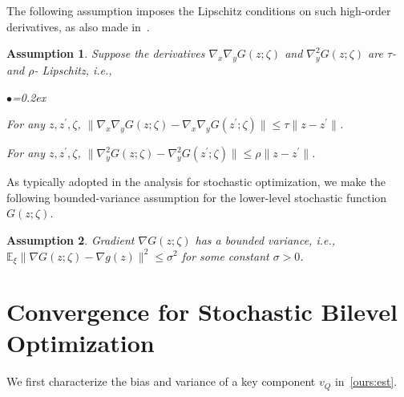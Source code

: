 \documentclass{osudissert96}
\newtheorem{assum}{Assumption}
\begin{document}
The following assumption imposes the Lipschitz conditions on such high-order derivatives, as also made in~\cite{ghadimi2018approximation}.
\begin{assum}\label{high_lip_stoc}
Suppose the derivatives $\nabla_x\nabla_y G(z;\zeta)$ and $\nabla_y^2 G(z;\zeta)$ are $\tau$- and $\rho$- Lipschitz, i.e.,
\begin{list}{$\bullet$}{\topsep=0.2ex \leftmargin=0.2in  \itemsep =0.02in}
\item For any $z,z^\prime,\zeta$, $\|\nabla_x\nabla_y G(z;\zeta)-\nabla_x\nabla_y G(z^\prime;\zeta)\| \leq \tau \|z-z^\prime\|$.
\item For any $z,z^\prime,\zeta$, $\|\nabla_y^2 G(z;\zeta)-\nabla_y^2G(z^\prime;\zeta)\|\leq \rho \|z-z^\prime\|$.
\end{list} 
\end{assum}
As typically adopted in the analysis for stochastic optimization, we make the following bounded-variance assumption for the lower-level stochastic function $G(z;\zeta)$. 
\begin{assum} \label{ass:bound} 
Gradient $\nabla G(z;\zeta)$ has a bounded variance, i.e., $\mathbb{E}_\xi \|\nabla G(z;\zeta)-\nabla g(z)\|^2 \leq \sigma^2$ for some constant $\sigma>0$.
\end{assum}
\section{Convergence for Stochastic Bilevel Optimization}\label{main:result}
We first  characterize the bias and variance of a key component $v_Q$ in~\cref{ours:est}. %
\end{document}
